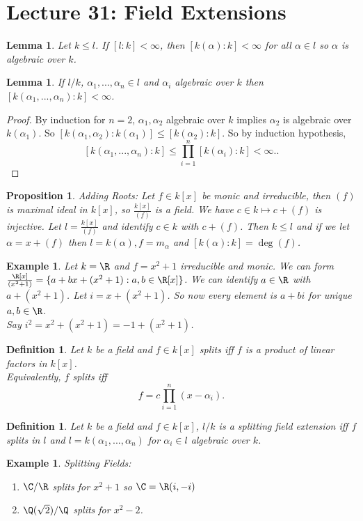 \documentclass[a4paper,12pt]{article}
\newtheorem{lem}[thm]{Lemma}
\newtheorem{defn}[thm]{Definition}
\newtheorem{eg}[thm]{Example}
\newtheorem{prop}[thm]{Proposition}
\begin{document}
\section{Lecture 31: Field Extensions}
\begin{lem}
    Let $k\leq l$. If $[l:k]<\infty$, then $[k(\alpha):k]<\infty$ for all $\alpha\in l$ so $\alpha$ is algebraic over $k$. 
\end{lem}
\begin{lem}
    If $l/k$, $\alpha_1,...,\alpha_n\in l$ and $\alpha_i$ algebraic over $k$ then $[k(\alpha_1,...,\alpha_n):k]<\infty$. 
\end{lem}
\begin{proof}
    By induction for $n=2$, $\alpha_1,\alpha_2$ algebraic over $k$ implies $\alpha_2$ is algebraic over $k(\alpha_1)$. So $[k(\alpha_1,\alpha_2):k(\alpha_1)]\leq [k(\alpha_2):k]$. So by induction hypothesis, 
    \[
    [k(\alpha_1,...,\alpha_n):k]\leq \prod_{i=1}^n [k(\alpha_i):k]<\infty.
    .\] 
\end{proof}
\begin{prop}
    Adding Roots: Let $f\in k[x]$ be monic and irreducible, then $(f)$ is maximal ideal in $k[x]$, so $\frac{k[x]}{(f)}$ is a field. We have $c\in k\mapsto c+(f)$ is injective. Let $l= \frac{k[x]}{(f)}$ and identify $c\in k$ with $c+(f)$. Then $k\leq l$ and if we let $\alpha=x+(f)$ then $l=k(\alpha), f=m_\alpha$ and $[k(\alpha):k]=\deg(f)$.  
\end{prop}
\begin{eg}
    Let $k=\R$ and $f=x^2+1$ irreducible and monic. We can form $\frac{\R[x]}{(x^2+1)}= \{a+bx+(x^2+1):a,b\in \R[x]\}$. We can identify $a\in \R$ with $a+(x^2+1)$. Let $i=x+(x^2+1)$. So now every element is $a+bi$ for unique $a,b\in \R$. \\
    Say $i^2=x^2+(x^2+1)=-1+(x^2+1)$. 
\end{eg}
\begin{defn}
    Let $k$ be a field and $f\in k[x]$ splits iff $f$ is a product of linear factors in $k[x]$. \\
    Equivalently, $f$ splits iff 
    \[
    f=c\prod_{i=1}^n (x-\alpha_i) 
    .\] 
\end{defn}
\begin{defn}
    Let $k$ be a field and $f\in k[x]$, $l/k$ is a splitting field extension iff $f$ splits in $l$ and $l=k(\alpha_1,...,\alpha_n)$ for $\alpha_i\in l$ algebraic over $k$. 
\end{defn}
\begin{eg}
    Splitting Fields:
    \begin{enumerate}
        \item $\C/\R$ splits for $x^2+1$ so $\C=\R(i,-i)$
        \item $\Q(\sqrt{2})/\Q$ splits for $x^2-2$. 
    \end{enumerate}
\end{eg}
\end{document}
